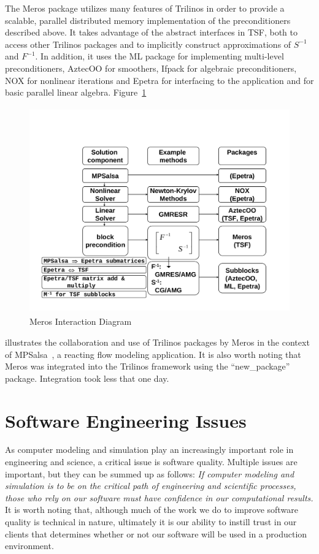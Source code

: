 \documentclass[acmtoms,acmnow]{acmtrans2m}
\begin{document}
The Meros package utilizes many features of Trilinos in order to
provide a scalable, parallel distributed memory implementation of the
preconditioners described above.  It takes advantage of the abstract
interfaces in TSF, both to access other Trilinos packages and to
implicitly construct approximations of $S^{-1}$ and $F^{-1}$.  In
addition, it uses
the ML package for implementing multi-level preconditioners, AztecOO
for smoothers, Ifpack for algebraic preconditioners, NOX for nonlinear
iterations and Epetra for
interfacing to the application and for basic parallel linear algebra.
Figure~\ref{Figure:MerosBlockDiagram} 
\begin{figure}
\begin{center}
\includegraphics[height=3.5in]{../CommonFiles/MerosBlockDiagram}
\end{center}
\caption{\label{Figure:MerosBlockDiagram}Meros Interaction Diagram}
\end{figure}
illustrates the collaboration and use of Trilinos packages by Meros
in the context of MPSalsa~\cite{MPSalsa-User-Guide}, a reacting flow modeling
application. It is also worth noting that Meros was integrated into
the Trilinos framework using the ``new\_package'' package.  Integration
took less that one day.


\section{Software Engineering Issues}
\label{sect:SQA}
As computer modeling and simulation play an increasingly important
role in engineering and science, a critical issue is software
quality.  Multiple issues are important, but they can be summed up as
follows: {\it If computer modeling and simulation is to be on the critical path 
of engineering and scientific processes, those who rely on our software must
 have confidence in our computational
results.}  It is worth noting that, although much of the work we do to
improve software quality is technical in nature, ultimately it is our
ability to instill trust in our clients that determines whether or not
our software will be used in a production environment.
\end{document}
